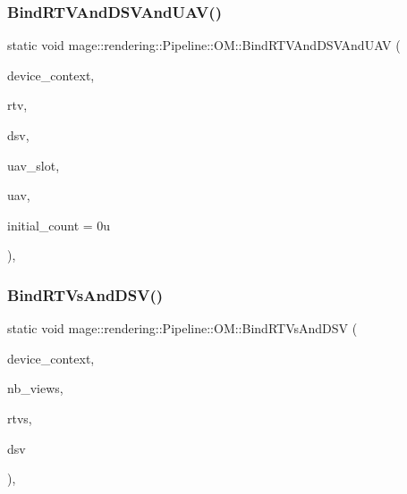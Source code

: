 \hypertarget{structmage_1_1rendering_1_1_pipeline_1_1_o_m_a07cc1907b5c69b9f7805766092269f94}{}\label{structmage_1_1rendering_1_1_pipeline_1_1_o_m_a07cc1907b5c69b9f7805766092269f94} 
\subsubsection{\texorpdfstring{Bind\+R\+T\+V\+And\+D\+S\+V\+And\+U\+A\+V()}{BindRTVAndDSVAndUAV()}}
{\footnotesize\ttfamily static void mage\+::rendering\+::\+Pipeline\+::\+O\+M\+::\+Bind\+R\+T\+V\+And\+D\+S\+V\+And\+U\+AV (\begin{DoxyParamCaption}\item[{I\+D3\+D11\+Device\+Context \&}]{device\+\_\+context,  }\item[{I\+D3\+D11\+Render\+Target\+View $\ast$}]{rtv,  }\item[{I\+D3\+D11\+Depth\+Stencil\+View $\ast$}]{dsv,  }\item[{\hyperlink{namespacemage_a41c104c036fba3756a74e19f793eeaa1}{U32}}]{uav\+\_\+slot,  }\item[{I\+D3\+D11\+Unordered\+Access\+View $\ast$}]{uav,  }\item[{\hyperlink{namespacemage_a41c104c036fba3756a74e19f793eeaa1}{U32}}]{initial\+\_\+count = {\ttfamily 0u} }\end{DoxyParamCaption})\hspace{0.3cm}{\ttfamily [static]}, {\ttfamily [noexcept]}}

\hypertarget{structmage_1_1rendering_1_1_pipeline_1_1_o_m_afda196018402df4f8eb44ff3e0a2d206}{}\label{structmage_1_1rendering_1_1_pipeline_1_1_o_m_afda196018402df4f8eb44ff3e0a2d206} 
\subsubsection{\texorpdfstring{Bind\+R\+T\+Vs\+And\+D\+S\+V()}{BindRTVsAndDSV()}}
{\footnotesize\ttfamily static void mage\+::rendering\+::\+Pipeline\+::\+O\+M\+::\+Bind\+R\+T\+Vs\+And\+D\+SV (\begin{DoxyParamCaption}\item[{I\+D3\+D11\+Device\+Context \&}]{device\+\_\+context,  }\item[{\hyperlink{namespacemage_a41c104c036fba3756a74e19f793eeaa1}{U32}}]{nb\+\_\+views,  }\item[{I\+D3\+D11\+Render\+Target\+View $\ast$const $\ast$}]{rtvs,  }\item[{I\+D3\+D11\+Depth\+Stencil\+View $\ast$}]{dsv }\end{DoxyParamCaption})\hspace{0.3cm}{\ttfamily [static]}, {\ttfamily [noexcept]}}

